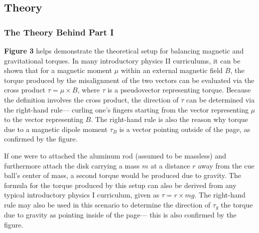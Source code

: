\documentclass[12pt]{article}
\begin{document}
\begin{multicols}{2}
\subsection{Theory}

\subsubsection{The Theory Behind Part I}
\textbf{Figure 3} helps demonstrate the theoretical setup for balancing magnetic and gravitational torques.
In many introductory physics II curriculums, it can be shown that for a magnetic moment $\mu$ within an external
magnetic field $B$, the torque produced by the misalignment of the two vectors can be evaluated via the cross 
product $\tau=\mu\times B$, where $\tau$ is a pseudovector representing torque.
Because the definition involves the cross product,
the direction of $\tau$ can be determined via the right-hand rule---
curling one's fingers starting from the vector representing $\mu$ to the vector representing $B$.
The right-hand rule is also the reason why torque due to a magnetic dipole moment $\tau_B$
is a vector pointing outside of the page, as confirmed by the figure.

If one were to attached the aluminum rod (assumed to be massless) and furthermore attach the disk carrying a mass $m$
at a distance $r$ away from the cue ball's center of mass, a second torque would be produced due to gravity.
The formula for the torque produced by this setup can also be derived from any typical introductory physics I curriculum,
given as $\tau=r\times mg$. The right-hand rule may also be used in this scenario to determine the direction of $\tau_g$
the torque due to gravity as pointing inside of the page--- this is also confirmed by the figure.


\end{multicols}
\end{document}
